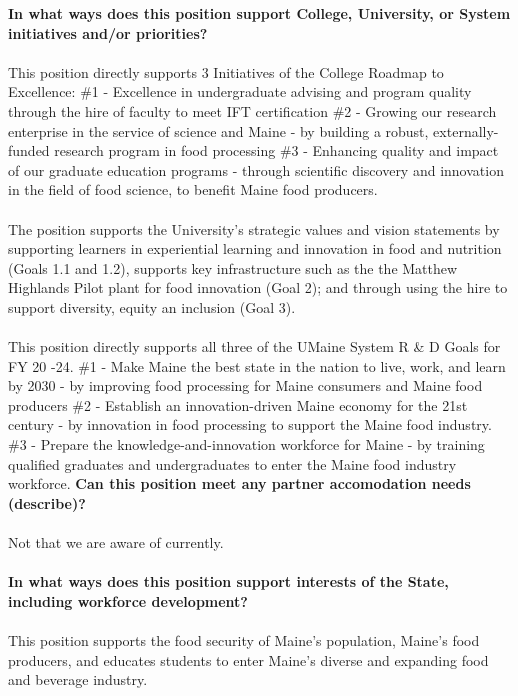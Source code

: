 \documentclass[11pt]{article}
\begin{document}
\newpage
\noindent\textbf{\rmfamily In what ways does this position support College, University, or System initiatives and/or priorities?}
\\~\\
This position directly supports 3 Initiatives of the College Roadmap to Excellence:
\#1 - Excellence in undergraduate advising and program quality through the hire of faculty to meet IFT certification
\#2 - Growing our research enterprise in the service of science and Maine - by building a robust, externally-funded research program in food processing 
\#3 - Enhancing quality and impact of our graduate education programs - through scientific discovery and innovation in the field of food science, to benefit Maine food producers.
\\~\\
The position supports the University's strategic values and vision statements by supporting learners in experiential learning and innovation in food and nutrition (Goals 1.1 and 1.2), supports key infrastructure such as the the Matthew Highlands Pilot plant for food innovation (Goal 2); and through using the hire to support diversity, equity an inclusion (Goal 3).
\\~\\
This position directly supports all three of the UMaine System R \& D Goals for FY 20 -24. 
\#1 - Make Maine the best state in the nation to live, work, and learn by 2030 - by improving food processing for Maine consumers and Maine food producers
\#2 - Establish an innovation-driven Maine economy for the 21st century - by innovation in food processing to support the Maine food industry.
\#3 - Prepare the knowledge-and-innovation workforce for Maine - by training qualified graduates and undergraduates to enter the Maine food industry workforce.
\vfill
\noindent\textbf{\rmfamily Can this position meet any partner accomodation needs (describe)?}
\\~\\Not that we are aware of currently.\\~\\
\vfill
\noindent\textbf{\rmfamily In what ways does this position support interests of the State, including workforce development?}\\~\\
This position supports the food security of Maine's population, Maine's food producers, and educates students to enter Maine's diverse and expanding food and beverage industry.
\\~\\
\end{document}
